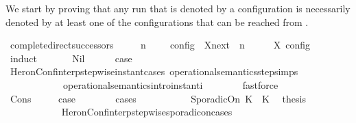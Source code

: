 \begin{isabellebody}
\begin{isamarkuptext}
  We start by proving that any run that is denoted by a configuration \isa{{\isasymS}}
  is necessarily denoted by at least one of the configurations that can be reached
  from \isa{{\isasymS}}.%
\end{isamarkuptext}\isamarkuptrue%
\isamarkupfalse%
\ complete{\isacharunderscore}direct{\isacharunderscore}successors{\isacharcolon}\isanewline
\ \ \ {\isacartoucheopen}{\isasymlbrakk}\ {\isasymGamma}{\isacharcomma}\ n\ {\isasymturnstile}\ {\isasymPsi}\ {\isasymtriangleright}\ {\isasymPhi}\ {\isasymrbrakk}\isactrlsub c\isactrlsub o\isactrlsub n\isactrlsub f\isactrlsub i\isactrlsub g\ {\isasymsubseteq}\ {\isacharparenleft}{\isasymUnion}X{\isasymin}{\isasymC}\isactrlsub n\isactrlsub e\isactrlsub x\isactrlsub t\ {\isacharparenleft}{\isasymGamma}{\isacharcomma}\ n\ {\isasymturnstile}\ {\isasymPsi}\ {\isasymtriangleright}\ {\isasymPhi}{\isacharparenright}{\isachardot}\ {\isasymlbrakk}\ X\ {\isasymrbrakk}\isactrlsub c\isactrlsub o\isactrlsub n\isactrlsub f\isactrlsub i\isactrlsub g{\isacharparenright}{\isacartoucheclose}\isanewline
%
\isadelimproof
\ \ %
\endisadelimproof
%
\isatagproof
{}\isamarkupfalse%
\ {\isacharparenleft}induct\ {\isasymPsi}{\isacharparenright}\isanewline
\ \ \ \ \isamarkupfalse%
\ Nil\isanewline
\ \ \ \ \isamarkupfalse%
\ {\isacharquery}case\isanewline
\ \ \ \ \ \ \isamarkupfalse%
\ HeronConf{\isacharunderscore}interp{\isacharunderscore}stepwise{\isacharunderscore}instant{\isacharunderscore}cases\ operational{\isacharunderscore}semantics{\isacharunderscore}step{\isachardot}simps\isanewline
\ \ \ \ \ \ \ \ \ \ \ \ operational{\isacharunderscore}semantics{\isacharunderscore}intro{\isachardot}instant{\isacharunderscore}i\isanewline
\ \ \ \ \ \ \isamarkupfalse%
\ fastforce\isanewline
\ \ \isamarkupfalse%
\isanewline
\ \ \ \ \isamarkupfalse%
\ {\isacharparenleft}Cons\ {\isasympsi}\ {\isasymPsi}{\isacharparenright}\ \ \isamarkupfalse%
\ {\isacharquery}case\isanewline
\ \ \ \ \ \ \isamarkupfalse%
\ {\isacharparenleft}cases\ {\isasympsi}{\isacharparenright}\isanewline
\ \ \ \ \ \ \ \ \isamarkupfalse%
\ {\isacharparenleft}SporadicOn\ K{}\ {\isasymtau}\ K{}{\isacharparenright}\ \isamarkupfalse%
\ {\isacharquery}thesis\ \isanewline
\ \ \ \ \ \ \ \ \ \ \isamarkupfalse%
\ HeronConf{\isacharunderscore}interp{\isacharunderscore}stepwise{\isacharunderscore}sporadicon{\isacharunderscore}cases\isanewline

\end{isabellebody}
